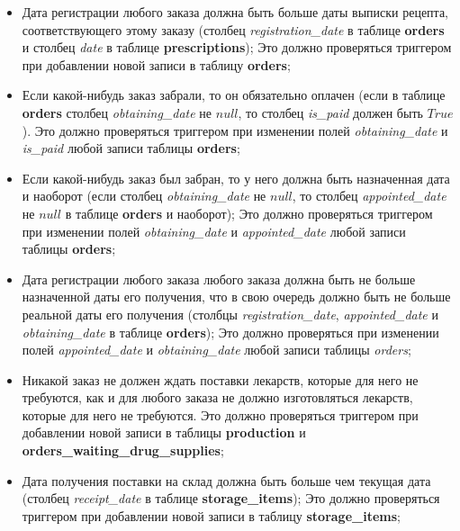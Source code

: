 \documentclass[a4paper]{article}
\newcommand{\dbtable}[1]{\textbf{#1}}
\newcommand{\dbtableref}[1]{\textit{#1}}
\begin{document}
\begin{itemize}
				\item Дата регистрации любого заказа должна быть больше даты выписки рецепта, соответствующего этому заказу (столбец \dbtableref{registration\_date} в таблице \dbtable{orders} и столбец \dbtableref{date} в таблице \dbtable{prescriptions}); Это должно проверяться триггером при добавлении новой записи в таблицу \dbtable{orders};
				
				\item Если какой-нибудь заказ забрали, то он обязательно оплачен (если в таблице \dbtable{orders} столбец \dbtableref{obtaining\_date} не $null$, то столбец \dbtableref{is\_paid} должен быть $True$). Это должно проверяться триггером при изменении полей \dbtableref{obtaining\_date} и \dbtableref{is\_paid} любой записи таблицы \dbtable{orders};
				
				\item Если какой-нибудь заказ был забран, то у него должна быть назначенная дата и наоборот (если столбец \dbtableref{obtaining\_date} не $null$, то столбец \dbtableref{appointed\_date} не $null$ в таблице \dbtable{orders} и наоборот); Это должно проверяться триггером при изменении полей \dbtableref{obtaining\_date} и \dbtableref{appointed\_date} любой записи таблицы \dbtable{orders};
				
				\item Дата регистрации любого заказа любого заказа должна быть не больше назначенной даты его получения, что в свою очередь должно быть не больше реальной даты его получения (столбцы \dbtableref{registration\_date}, \dbtableref{appointed\_date} и \dbtableref{obtaining\_date} в таблице \dbtable{orders}); Это должно проверяться при изменении полей \dbtableref{appointed\_date} и \dbtableref{obtaining\_date} любой записи таблицы \dbtableref{orders};
				
				\item Никакой заказ не должен ждать поставки лекарств, которые для него не требуются, как и для любого заказа не должно изготовляться лекарств, которые для него не требуются. Это должно проверяться триггером при добавлении новой записи в таблицы \dbtable{production} и \dbtable{orders\_waiting\_drug\_supplies};
					
				\item Дата получения поставки на склад должна быть больше чем текущая дата (столбец \dbtableref{receipt\_date} в таблице \dbtable{storage\_items}); Это должно проверяться триггером при добавлении новой записи в таблицу \dbtable{storage\_items};
				

\end{itemize}
\end{document}
